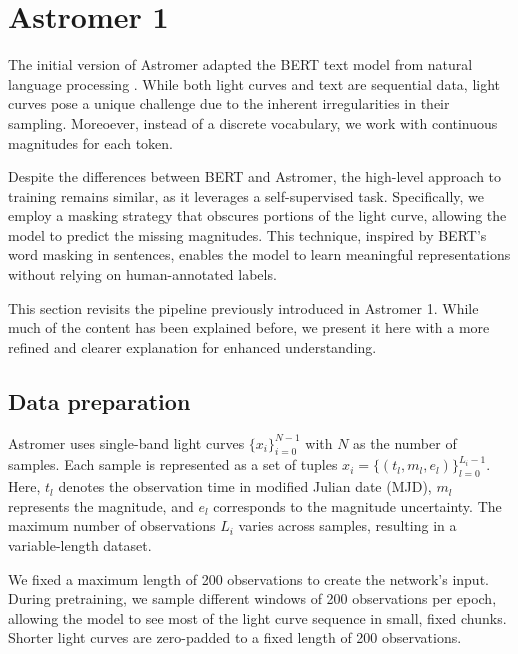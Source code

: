 \section{Astromer 1}\label{sec:astromer0}
The initial version of Astromer \citep{astromer} adapted the BERT text model from natural language processing \citep{devlin2018bert}. While both light curves and text are sequential data, light curves pose a unique challenge due to the inherent irregularities in their sampling. Moreoever,  instead of a discrete vocabulary, we work with continuous magnitudes for each token. 

Despite the differences between BERT and Astromer, the high-level approach to training remains similar, as it leverages a self-supervised task. 
Specifically, we employ a masking strategy that obscures portions of the light curve, allowing the model to predict the missing magnitudes. This technique, inspired by BERT’s word masking in sentences, enables the model to learn meaningful representations without relying on human-annotated labels.

This section revisits the pipeline previously introduced in Astromer 1. While much of the content has been explained before, we present it here with a more refined and clearer explanation for enhanced understanding.


\subsection{Data preparation}\label{sec:data_preparation}
Astromer uses single-band light curves $\{x_i\}_{i=0}^{N-1}$ with $N$ as the number of samples. Each sample is represented as a set of tuples $x_i = \{(t_l, m_l, e_l)\}_{l=0}^{L_i-1}$. Here, $t_l$ denotes the observation time in modified Julian date (MJD), $m_l$ represents the magnitude, and $e_l$ corresponds to the magnitude uncertainty. The maximum number of observations $L_i$ varies across samples, resulting in a variable-length dataset. 

We fixed a maximum length of 200 observations to create the network’s input. During pretraining, we sample different windows of 200 observations per epoch, allowing the model to see most of the light curve sequence in small, fixed chunks. Shorter light curves are zero-padded to a fixed length of 200 observations.

